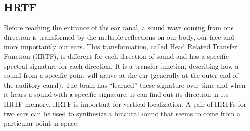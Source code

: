 \documentclass[BTech]{nitkdiss}
\begin{document}
\subsection{HRTF}
Before reaching the entrance of the ear canal, a sound wave coming from one direction is transformed by the multiple reflections on our body, our face and more importantly our ears. This transformation, called Head Related Transfer Function (HRTF), is different for each direction of sound and has a specific spectral signature for each direction. It is a transfer function, describing how a sound from a specific point will arrive at the ear (generally at the outer end of the auditory canal). The brain has “learned” these signature over time and when it hears a sound with a specific signature, it can find out its direction in its HRTF memory. HRTF is important for vertical localization. A pair of HRTFs for two ears can be used to synthesize a binaural sound that seems to come from a particular point in space. 
\end{document}
